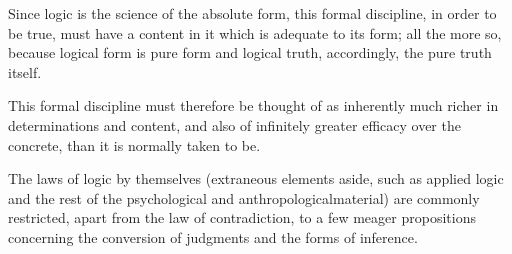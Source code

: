 Since logic is the science of the absolute form, this formal discipline,
in order to be true, must have a content in it which is adequate to its form;
all the more so, because logical form is pure form and
logical truth, accordingly, the pure truth itself.

This formal discipline must therefore be thought of
as inherently much richer in determinations and content,
and also of infinitely greater efficacy over the concrete,
than it is normally taken to be.

The laws of logic by themselves
(extraneous elements aside, such as applied logic and
the rest of the psychological and anthropologicalmaterial)
are commonly restricted, apart from the law of contradiction,
to a few meager propositions concerning the conversion of judgments
and the forms of inference.

